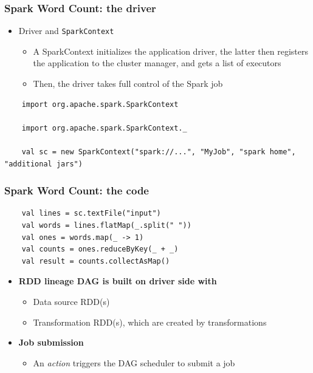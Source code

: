 \begin{frame}[fragile] 
\frametitle{Spark Word Count: the driver}

\begin{itemize}
	\item Driver and \texttt{SparkContext}
	\begin{itemize}
		\item A SparkContext initializes the application driver, the latter then registers the application to the cluster manager, and gets a list of executors
		\item Then, the driver takes full control of the Spark job
	\end{itemize}
\end{itemize}

\begin{lstlisting}
	import org.apache.spark.SparkContext

	import org.apache.spark.SparkContext._

	val sc = new SparkContext("spark://...", "MyJob", "spark home", "additional jars") 
\end{lstlisting}

\end{frame}

\begin{frame}[fragile] 
\frametitle{Spark Word Count: the code}
\begin{lstlisting}
	val lines = sc.textFile("input")
	val words = lines.flatMap(_.split(" ")) 
	val ones = words.map(_ -> 1)
	val counts = ones.reduceByKey(_ + _) 
	val result = counts.collectAsMap()
\end{lstlisting}

\begin{itemize}
	\item {\bf RDD lineage DAG is built on driver side with}
	\begin{itemize}
		\item Data source RDD(s)
		\item Transformation RDD(s), which are created by transformations
	\end{itemize}

	\vspace{10pt}

	\item {\bf Job submission}
	\begin{itemize}
		\item An \emph{action} triggers the DAG scheduler to submit a job
	\end{itemize}
\end{itemize}

\end{frame}

